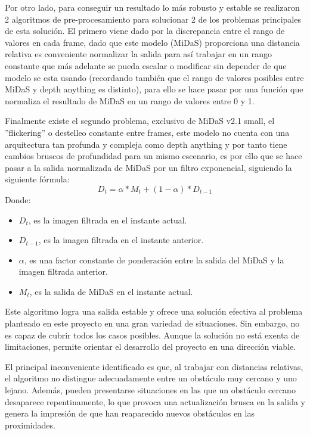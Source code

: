 \newpage

Por otro lado, para conseguir un resultado lo más robusto y estable se realizaron 2 algoritmos de pre-procesamiento para solucionar 2 de los problemas principales de esta solución. El primero viene dado por la discrepancia entre el rango de valores en cada frame, dado que este modelo (MiDaS) proporciona una distancia relativa es conveniente normalizar la salida para así trabajar en un rango constante que más adelante se pueda escalar o modificar sin depender de que modelo se esta usando (recordando también que el rango de valores posibles entre MiDaS y depth anything es distinto), para ello se hace pasar por una función que normaliza el resultado de MiDaS en un rango de valores entre 0 y 1.

Finalmente existe el segundo problema, exclusivo de MiDaS v2.1 small, el ''flickering'' o destelleo constante entre frames, este modelo no cuenta con una arquitectura tan profunda y compleja como depth anything y por tanto tiene cambios bruscos de profundidad para un mismo escenario, es por ello que se hace pasar a la salida normalizada de MiDaS por un filtro exponencial, siguiendo la siguiente fórmula:
$$D_{t} = \alpha * M_{t} + (1 - \alpha) * D_{t-1}$$
\newpage
Donde:
\begin{itemize}
    \item $D_{t}$, es la imagen filtrada en el instante actual.
    \item $D_{t-1}$, es la imagen filtrada en el instante anterior.
    \item $\alpha$, es una factor constante de ponderación entre la salida del MiDaS y la imagen filtrada anterior.
    \item $M_{t}$, es la salida de MiDaS en el instante actual.
\end{itemize}

Este algoritmo logra una salida estable y ofrece una solución efectiva al problema planteado en este proyecto en una gran variedad de situaciones. Sin embargo, no es capaz de cubrir todos los casos posibles. Aunque la solución no está exenta de limitaciones, permite orientar el desarrollo del proyecto en una dirección viable.

El principal inconveniente identificado es que, al trabajar con distancias relativas, el algoritmo no distingue adecuadamente entre un obstáculo muy cercano y uno lejano. Además, pueden presentarse situaciones en las que un obstáculo cercano desaparece repentinamente, lo que provoca una actualización brusca en la salida y genera la impresión de que han reaparecido nuevos obstáculos en las proximidades.

